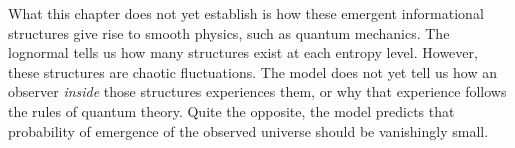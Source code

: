 What this chapter does not yet establish is how these emergent
informational structures give rise to smooth physics, such as
quantum mechanics. The lognormal
tells us how many structures exist at each entropy level. However,
these structures are chaotic fluctuations. The model does not
yet tell us how an observer \emph{inside} those structures experiences
them, or why that experience follows the rules of quantum theory.
Quite the opposite, the model predicts that probability of emergence
of the observed universe should be vanishingly small.

